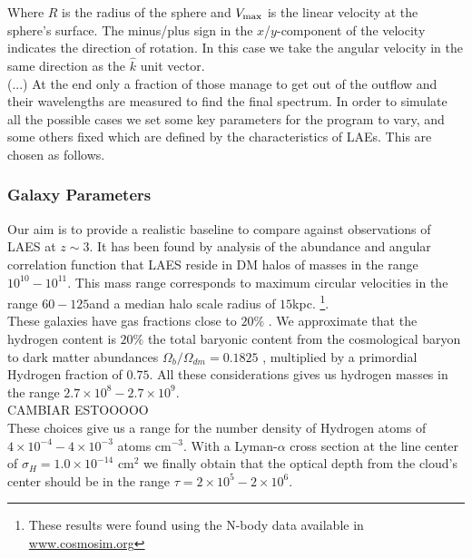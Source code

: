 \documentclass{latex/emulateapj}
\begin{document}
Where $R$ is the radius of the sphere and $V_{\rm max}$ is the linear velocity at the sphere's surface. The minus/plus sign in the $x$/$y$-component of the velocity indicates the direction of rotation. In this case we take the angular velocity in the same direction as the $\hat{k}$ unit vector. \\

(...) At the end only a fraction of those manage to get out of the outflow and their wavelengths are measured to find the
final spectrum. In order to simulate all the possible cases we set some key parameters for the program to vary, and some others fixed which are defined by the characteristics of LAEs. This are chosen as follows.\\

\subsubsection{Galaxy Parameters}

Our aim is to provide a realistic baseline to compare against observations of LAES at $z\sim 3$. It has been found by analysis of the abundance and angular correlation function that LAES reside in DM halos of masses in the range $10^{10}-10^{11}$\Msun \cite{WalkerSoler2012}. This mass range corresponds to maximum circular velocities in the range $60-125$\kms and a median halo scale radius of $15$kpc. \footnote{These results were found using the  N-body data available in \url{www.cosmosim.org}}. \\

These galaxies have gas fractions close to $20\%$ \citep{Narayanan2012}. We approximate that the hydrogen content is
$20\%$ the total baryonic content from the cosmological baryon to dark matter  abundances $\Omega_b/\Omega_{dm}=0.1825$ \citep{Planck2015}, multiplied by a primordial Hydrogen fraction of $0.75$. All these considerations gives us hydrogen masses in the range $2.7\times 10^{8}-2.7\times 10^{9}$\Msun.\\

CAMBIAR ESTOOOOO\\

These choices give us a range for the number density of Hydrogen atoms of $4\times10^{-4}-4\times 10^{-3}$ atoms cm$^{-3}$. With a Lyman-$\alpha$ cross section at the line center of $\sigma_{H}=1.0\times 10^{-14}$ cm$^{2}$ we finally obtain that the optical depth from the cloud's center  should be in the range $\tau=2 \times 10^{5} - 2 \times 10^{6}$.  \\
\end{document}

